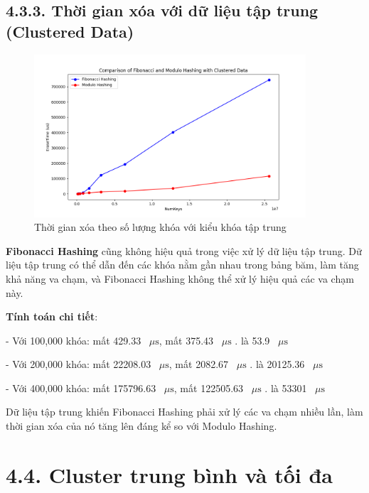 \documentclass[12pt,a4paper]{report}
\begin{document}
\subsection*{4.3.3. Thời gian xóa với dữ liệu tập trung (Clustered Data)}
\begin{figure}[!ht]
    \centering
    \includegraphics[width=0.9\textwidth]{del_clus.png}
    \caption{Thời gian xóa theo số lượng khóa với kiểu khóa tập trung}
    \label{fig:del_clus}
\end{figure}
\noindent \indent \textbf{Fibonacci Hashing} cũng không hiệu quả trong việc xử lý dữ liệu tập trung. Dữ liệu tập trung có thể dẫn đến các khóa nằm gần nhau trong bảng băm, làm tăng khả năng va chạm, và Fibonacci Hashing không thể xử lý hiệu quả các va chạm này.

\textbf{Tính toán chi tiết}:

  - Với 100,000 khóa:
   mất 429.33 \, $\mu\text{s}$,  mất 375.43 \, $\mu\text{s}$ . là 53.9 \, $\mu\text{s}$

  - Với 200,000 khóa:
   mất 22208.03 \, $\mu\text{s}$,  mất 2082.67 \, $\mu\text{s}$ . là 20125.36 \, $\mu\text{s}$

  - Với 400,000 khóa:
   mất 175796.63 \, $\mu\text{s}$, mất 122505.63 \, $\mu\text{s}$ . là 53301 \, $\mu\text{s}$

Dữ liệu tập trung khiến Fibonacci Hashing phải xử lý các va chạm nhiều lần, làm thời gian xóa của nó tăng lên đáng kể so với Modulo Hashing.
\section*{4.4. Cluster trung bình và tối đa}
\end{document}
